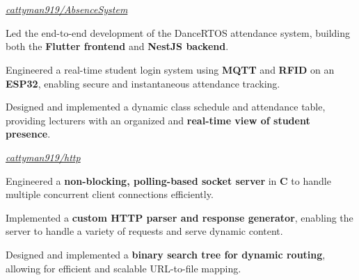 \documentclass[../main.tex]{subfiles}
\begin{document}
\section{}

\begin{twocolentry}{
    \small
    \textit{\href{https://github.com/cattyman919/AbsenceSystem}{cattyman919/AbsenceSystem}}
}
\end{twocolentry}

\vspace{0.10 cm}
\begin{onecolentry}
\begin{highlights}
    \item Led the end-to-end development of the DanceRTOS attendance system, building both the \textbf{Flutter frontend} and \textbf{NestJS backend}.
    \item Engineered a real-time student login system using \textbf{MQTT} and \textbf{RFID} on an \textbf{ESP32}, enabling secure and instantaneous attendance tracking.
    \item Designed and implemented a dynamic class schedule and attendance table, providing lecturers with an organized and \textbf{real-time view of student presence}.
\end{highlights}
\end{onecolentry}

\vspace{0.2 cm}

\begin{twocolentry}{
    \small
    \textit{\href{https://github.com/cattyman919/http}{cattyman919/http}}
}
\end{twocolentry}

\vspace{0.10 cm}
\begin{onecolentry}
\begin{highlights}
    \item Engineered a \textbf{non-blocking, polling-based socket server} in \textbf{C} to handle multiple concurrent client connections efficiently.
    \item Implemented a \textbf{custom HTTP parser and response generator}, enabling the server to handle a variety of requests and serve dynamic content.
    \item Designed and implemented a \textbf{binary search tree for dynamic routing}, allowing for efficient and scalable URL-to-file mapping.
\end{highlights}
\end{onecolentry}
\end{document}
